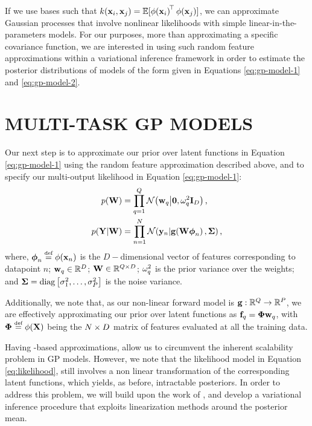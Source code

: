 If we use \rks bases  such that
$k\!\left({{\mathbf{x}_i}, {\mathbf{x}_j}}\right) = 
\mathbb{E}[\phi\!\left({{\mathbf{x}_i}}\right)^{\!\top}\phi\!\left({{\mathbf{x}_j}}\right)]$, we can
approximate Gaussian processes that involve nonlinear likelihoods 
with simple linear-in-the-parameters models. 
For our purposes, more than approximating a specific covariance function, we are 
interested in using such random feature approximations within a variational inference 
framework in order to estimate the posterior distributions of models of the form given
in Equations \eqref{eq:gp-model-1} and \eqref{eq:gp-model-2}. 
%
\section{MULTI-TASK GP MODELS}
 Our next step is to approximate our prior over latent functions in Equation \eqref{eq:gp-model-1} 
 using the random feature approximation described above, and to specify 
 our multi-output likelihood in Equation \eqref{eq:gp-model-1}:
 \begin{align}
 \label{eq:prior}
 p(\mathbf{W}) &=  \prod^Q_{q=1} \mathcal{N}\!\left({\mathbf{w}_q}\middle\vert{\mathbf{0}, \ensuremath{\omega^2}_q \ensuremath{\mathbf{I}_{D}}}\right) \text{,} \\
  \label{eq:likelihood}
    p\!\left({\mathbf{Y} }\middle\vert{\ensuremath{\mathbf{W}}}\right) &=
        \prod^N_{n=1} \mathcal{N}\!\left({\mathbf{y}_n}\middle\vert{\ensuremath{\mathbf{g}\!\left({{\mathbf{W}\boldsymbol\phi_n}}\right)}, \ensuremath{\mathbf{\Sigma}}}\right)  \text{,}
\end{align}
%
where,  $\feats_n \defeq \featfunc{\ins_n}$  is the 
 $D-$dimensional vector of features corresponding to datapoint $n$; 
$\mathbf{w}_q \in \mathbb{R}^{D}$;
 $\mathbf{W} \in \mathbb{R}^{Q   \times D}$;
$\omega^2_q$ is the prior variance over the weights; 
 and $\mathbf{\Sigma} = \operatorname{diag}{\left[{\sigma^2_1, \ldots, \sigma^2_P}\right]}$ is the  
 noise variance. 
 
Additionally, we note that, as our non-linear
forward model  is $\mathbf{g} : \mathbb{R}^{Q} \to \mathbb{R}^{P}$,  
we are effectively  approximating our prior over latent functions as 
 $\mathbf{f}_q = \boldsymbol\Phi\mathbf{w}_q$, with  $\Feats \defeq \featfunc{\Ins}$
 being the $N \times D$  matrix of features evaluated at all the training data. 
 
Having \rks-based approximations, allow us to circumvent the inherent
scalability problem in GP models. However, we note that the likelihood model 
in Equation  \eqref{eq:likelihood}, still involves a non linear transformation 
of the corresponding latent functions, which yields, as before, intractable posteriors. 
In order to address this problem, we will build upon the work of 
\cite{steinberg-bonilla-nips-2014}, and develop a variational inference procedure 
that exploits linearization methods around the posterior mean.



